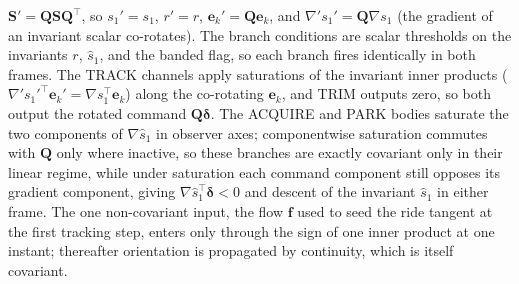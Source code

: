 \documentclass[lettersize,journal]{IEEEtran}
\begin{document}
\begin{IEEEproof}
$\mathbf{S}' = \mathbf{Q}\mathbf{S}\mathbf{Q}^\top$, so $s_1' = s_1$,
$r' = r$, $\mathbf{e}_k' = \mathbf{Q}\mathbf{e}_k$, and $\nabla' s_1' =
\mathbf{Q}\nabla s_1$ (the gradient of an invariant scalar co-rotates).
The branch conditions are scalar thresholds on the invariants $r$,
$\hat{s}_1$, and the banded flag, so each branch fires identically in
both frames. The TRACK channels apply saturations of the invariant
inner products
($\nabla' s_1'^\top \mathbf{e}_k' = \nabla s_1^\top \mathbf{e}_k$)
along the co-rotating $\mathbf{e}_k$, and TRIM outputs zero, so both
output the rotated command $\mathbf{Q}\boldsymbol{\delta}$. The ACQUIRE
and PARK bodies saturate the two components of $\nabla\hat{s}_1$ in
observer axes; componentwise saturation commutes with $\mathbf{Q}$ only
where inactive, so these branches are exactly covariant only in their
linear regime, while under saturation each command component still
opposes its gradient component, giving $\nabla\hat{s}_1^\top
\boldsymbol{\delta} < 0$ and descent of the invariant $\hat{s}_1$ in
either frame. The one non-covariant input, the flow
$\mathbf{f}$ used to seed the ride tangent at the first tracking step,
enters only through the sign of one inner product at one instant;
thereafter orientation is propagated by continuity, which is itself
covariant.
\end{IEEEproof}
\end{document}
